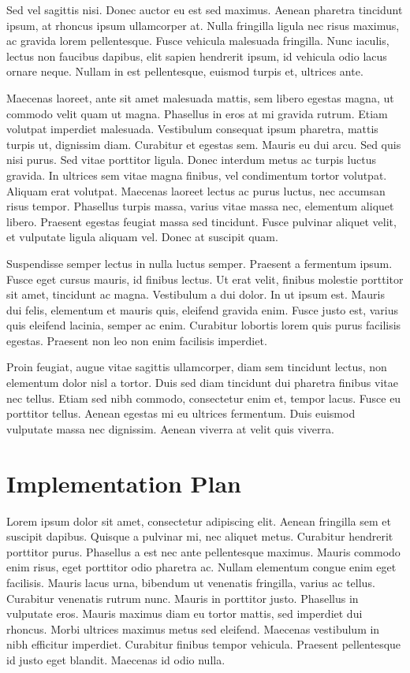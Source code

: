 \documentclass[12pt, letterpaper]{article}
\begin{document}
Sed vel sagittis nisi. Donec auctor eu est sed maximus. Aenean pharetra tincidunt ipsum, at rhoncus ipsum ullamcorper at. Nulla fringilla ligula nec risus maximus, ac gravida lorem pellentesque. Fusce vehicula malesuada fringilla. Nunc iaculis, lectus non faucibus dapibus, elit sapien hendrerit ipsum, id vehicula odio lacus ornare neque. Nullam in est pellentesque, euismod turpis et, ultrices ante.

Maecenas laoreet, ante sit amet malesuada mattis, sem libero egestas magna, ut commodo velit quam ut magna. Phasellus in eros at mi gravida rutrum. Etiam volutpat imperdiet malesuada. Vestibulum consequat ipsum pharetra, mattis turpis ut, dignissim diam. Curabitur et egestas sem. Mauris eu dui arcu. Sed quis nisi purus. Sed vitae porttitor ligula. Donec interdum metus ac turpis luctus gravida. In ultrices sem vitae magna finibus, vel condimentum tortor volutpat. Aliquam erat volutpat. Maecenas laoreet lectus ac purus luctus, nec accumsan risus tempor. Phasellus turpis massa, varius vitae massa nec, elementum aliquet libero. Praesent egestas feugiat massa sed tincidunt. Fusce pulvinar aliquet velit, et vulputate ligula aliquam vel. Donec at suscipit quam.

Suspendisse semper lectus in nulla luctus semper. Praesent a fermentum ipsum. Fusce eget cursus mauris, id finibus lectus. Ut erat velit, finibus molestie porttitor sit amet, tincidunt ac magna. Vestibulum a dui dolor. In ut ipsum est. Mauris dui felis, elementum et mauris quis, eleifend gravida enim. Fusce justo est, varius quis eleifend lacinia, semper ac enim. Curabitur lobortis lorem quis purus facilisis egestas. Praesent non leo non enim facilisis imperdiet.

Proin feugiat, augue vitae sagittis ullamcorper, diam sem tincidunt lectus, non elementum dolor nisl a tortor. Duis sed diam tincidunt dui pharetra finibus vitae nec tellus. Etiam sed nibh commodo, consectetur enim et, tempor lacus. Fusce eu porttitor tellus. Aenean egestas mi eu ultrices fermentum. Duis euismod vulputate massa nec dignissim. Aenean viverra at velit quis viverra.

\section{Implementation Plan}
Lorem ipsum dolor sit amet, consectetur adipiscing elit. Aenean fringilla sem et suscipit dapibus. Quisque a pulvinar mi, nec aliquet metus. Curabitur hendrerit porttitor purus. Phasellus a est nec ante pellentesque maximus. Mauris commodo enim risus, eget porttitor odio pharetra ac. Nullam elementum congue enim eget facilisis. Mauris lacus urna, bibendum ut venenatis fringilla, varius ac tellus. Curabitur venenatis rutrum nunc. Mauris in porttitor justo. Phasellus in vulputate eros. Mauris maximus diam eu tortor mattis, sed imperdiet dui rhoncus. Morbi ultrices maximus metus sed eleifend. Maecenas vestibulum in nibh efficitur imperdiet. Curabitur finibus tempor vehicula. Praesent pellentesque id justo eget blandit. Maecenas id odio nulla.
\end{document}
